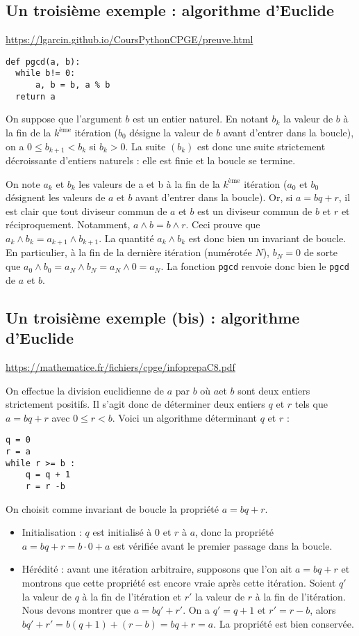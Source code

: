 \subsection{Un troisième exemple : algorithme d'Euclide}
\url{https://lgarcin.github.io/CoursPythonCPGE/preuve.html}

\begin{lstlisting}
def pgcd(a, b):
  while b!= 0:
      a, b = b, a % b
  return a
\end{lstlisting}

On suppose que l'argument $b$ est un entier naturel. En notant $b_k$ la valeur de $b$ à la fin de la $k^\text{ème}$ itération ($b_0$ désigne la valeur de $b$ avant d'entrer dans la boucle), on a $0\leq b_{k+1}<b_k$ si $b_k>0$. La suite $(b_k)$ est donc une suite strictement décroissante d'entiers naturels : elle est finie et la boucle se termine.


On note $a_k$ et $b_k$ les valeurs de a et b à la fin de la $k^\text{ème}$ itération ($a_0$ et $b_0$ désignent les valeurs de $a$ et $b$ avant d'entrer dans la boucle). Or, si $a=bq+r$, il est clair que tout diviseur commun de $a$ et $b$ est un diviseur commun de $b$ et $r$ et réciproquement. Notamment, $a\wedge b=b\wedge r$. Ceci prouve que $a_k\wedge b_k=a_{k+1}\wedge b_{k+1}$. La quantité $a_k\wedge b_k$ est donc bien un invariant de boucle. En particulier, à la fin de la dernière itération (numérotée $N$), $b_N=0$ de sorte que $a_0\wedge b_0=a_N\wedge b_N=a_N\wedge0=a_N$. La fonction \texttt{pgcd} renvoie donc bien le \texttt{pgcd} de $a$ et $b$.

\subsection{Un troisième exemple (bis) : algorithme d'Euclide}
\url{https://mathematice.fr/fichiers/cpge/infoprepaC8.pdf}

On effectue la division euclidienne de $a$ par $b$ où $a $et $b$ sont deux entiers strictement positifs. Il s’agit
donc de déterminer deux entiers $q$ et $r$ tels que $a = bq+r$ avec $0 \leq r < b$. Voici un algorithme déterminant
$q$ et $r$ :

\begin{lstlisting}
q = 0
r = a
while r >= b :
    q = q + 1
    r = r -b
\end{lstlisting}

On choisit comme invariant de boucle la propriété $a = bq + r$.
\begin{itemize}
\item Initialisation : $q$ est initialisé à 0 et $r$ à $a$, donc la propriété $a = bq + r = b\cdot 0 + a$ est vérifiée avant le premier passage dans la boucle.
\item Hérédité : avant une itération arbitraire, supposons que l’on ait $a = bq + r$ et montrons que cette propriété est encore vraie après cette itération. Soient $q'$ la valeur de $q$ à la fin de l’itération et $r'$ la valeur de $r$ à la fin de l’itération. Nous devons montrer que $a = bq' + r'$. On a $q'= q + 1$ et $r' = r- b$, alors $bq' + r' = b(q + 1) + (r - b) = bq + r = a$. La propriété est bien conservée.
\end{itemize}


